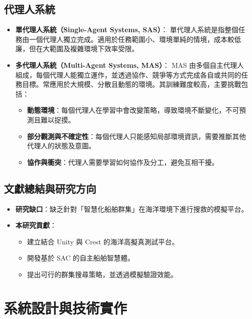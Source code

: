 \documentclass[12pt,a4paper]{article}
\begin{document}
\newpage

\subsection{代理人系統}

\begin{itemize}
  \item \textbf{單代理人系統（Single-Agent Systems, SAS）}\cite{DiffAgent}：
  單代理人系統是指整個任務由一個代理人獨立完成。適用於任務範圍小、環境單純的情境，成本較低廉，但在大範圍及複雜環境下效率受限。
  
  \item \textbf{多代理人系統（Multi-Agent Systems, MAS）}：
  MAS 由多個自主代理人組成，每個代理人能獨立運作，並透過協作、競爭等方式完成各自或共同的任務目標。常應用於大規模、分散且動態的環境\cite{MultiAgent}。其訓練難度較高，主要挑戰包括\cite{MultiChallenge}：
  \begin{itemize}
    \item \textbf{動態環境}：每個代理人在學習中會改變策略，導致環境不斷變化，不可預測且難以捉摸。
    \item \textbf{部分觀測與不確定性}：每個代理人只能感知局部環境資訊，需要推斷其他代理人的狀態及意圖。
    \item \textbf{協作與衝突}：代理人需要學習如何協作及分工，避免互相干擾。
  \end{itemize}
\end{itemize}

\subsection{文獻總結與研究方向}

\begin{itemize}
  \item \textbf{研究缺口}：缺乏針對「智慧化船舶群集」在海洋環境下進行搜救的模擬平台。
  \item \textbf{本研究貢獻}：
  \begin{itemize}
    \item 建立結合 Unity 與 Crest 的海洋高擬真測試平台。
    \item 開發基於 SAC 的自主船舶智慧體。
    \item 提出可行的群集搜尋策略，並透過模擬驗證效能。
  \end{itemize}
\end{itemize}

\newpage

\section{系統設計與技術實作}
\end{document}
